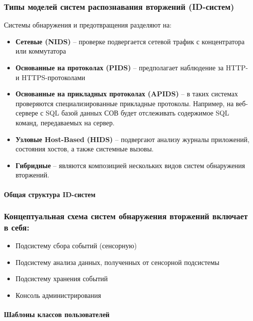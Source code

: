 \subsubsection*{Типы моделей систем распознавания вторжений (ID-систем)}

Системы обнаружения и предотвращения разделяют на:

\begin{itemize}
	\item \textbf{Сетевые (NIDS)} -- проверке подвергается сетевой трафик с концентратора или коммутатора
	\item \textbf{Основанные на протоколах (PIDS)} -- предполагает наблюдение за HTTP- и HTTPS-протоколами
	\item \textbf{Основанные на прикладных протоколах (APIDS)} -- в таких системах проверяются специализированные прикладные протоколы. Например, на веб-сервере с SQL базой данных СОВ будет отслеживать содержимое SQL команд, передаваемых на сервер.
	\item \textbf{Узловые Host-Based (HIDS)} -- подвергают анализу журналы приложений, состояния хостов, а также системные вызовы.
	\item \textbf{Гибридные} -- являются композицией нескольких видов систем обнаружения вторжений.
\end{itemize}

\paragraph{Общая структура ID-систем} 

\subsubsection*{Концептуальная схема систем обнаружения вторжений включает в себя:}
\begin{itemize}
	\item Подсистему сбора событий (сенсорную)
	\item Подсистему анализа данных, полученных от сенсорной подсистемы
	\item Подсистему хранения событий
	\item Консоль администрирования
\end{itemize}

\paragraph{Шаблоны классов пользователей}

